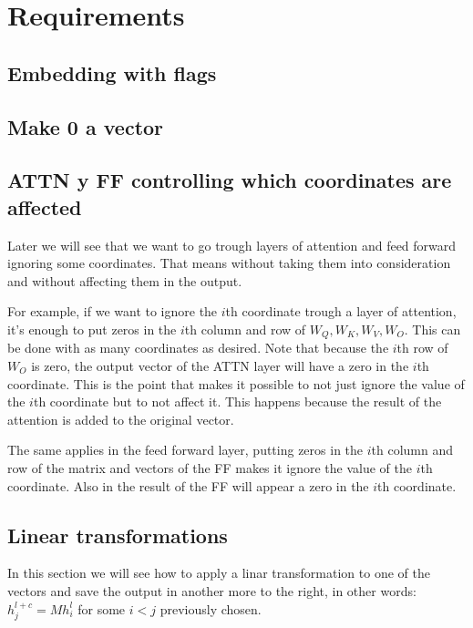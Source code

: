 \section*{Requirements}

\subsection*{Embedding with flags}


\subsection*{Make 0 a vector }


\subsection*{ATTN y FF controlling which coordinates are affected}
Later we will see that we want to go trough layers of attention and feed forward ignoring some coordinates. That means without taking them into consideration and without affecting them in the output.

For example, if we want to ignore the $i$th coordinate trough a layer of attention, it's enough to put zeros in the $i$th column and row of $W_Q, W_K, W_V, W_O$. This can be done with as many coordinates as desired. Note that because the $i$th row of $W_O$ is zero, the output vector of the ATTN layer will have a zero in the $i$th coordinate. This is the point that makes it possible to not just ignore the value of the $i$th coordinate but to not affect it. This happens because the result of the attention is added to the original vector.

The same applies in the feed forward layer, putting zeros in the $i$th column and row of the matrix and vectors of the FF makes it ignore the value of the $i$th coordinate. Also in the result of the FF will appear a zero in the $i$th coordinate.

\subsection*{Linear transformations}

In this section we will see how to apply a linar transformation to one of the vectors and save the output in another more to the right, in other words: $h_j^{l+c} = M h_i^l$ for some $i < j$ previously chosen.

